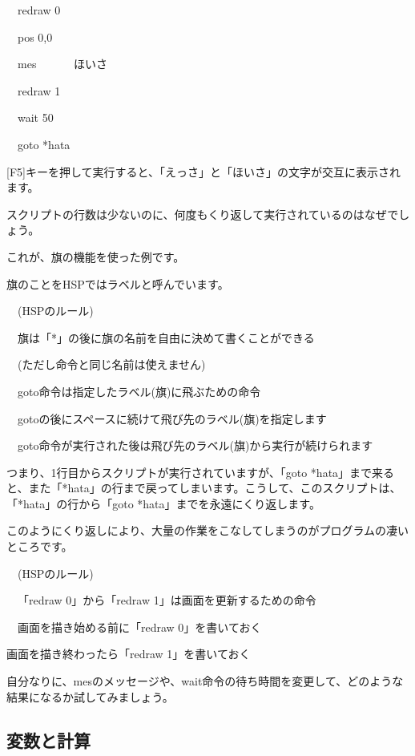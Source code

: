 \documentclass[a4paper,12pt]{jarticle}
\begin{document}
\ \ redraw 0

\ \ pos 0,0

\ \ mes {\textquotedbl}　　　ほいさ{\textquotedbl}

\ \ redraw 1

\ \ wait 50

\ \ goto *hata


\bigskip

[F5]キーを押して実行すると、「えっさ」と「ほいさ」の文字が交互に表示されます。

スクリプトの行数は少ないのに、何度もくり返して実行されているのはなぜでしょう。

これが、旗の機能を使った例です。

旗のことをHSPではラベルと呼んでいます。


\bigskip

\ \ (HSPのルール)


\bigskip

\ \ 旗は「*」の後に旗の名前を自由に決めて書くことができる

\ \ (ただし命令と同じ名前は使えません)

\ \ goto命令は指定したラベル(旗)に飛ぶための命令

\ \ gotoの後にスペースに続けて飛び先のラベル(旗)を指定します

\ \ goto命令が実行された後は飛び先のラベル(旗)から実行が続けられます


\bigskip

つまり、1行目からスクリプトが実行されていますが、「goto
*hata」まで来ると、また「*hata」の行まで戻ってしまいます。こうして、このスクリプトは、「*hata」の行から「goto
*hata」までを永遠にくり返します。

このようにくり返しにより、大量の作業をこなしてしまうのがプログラムの凄いところです。

\bigskip

\ \ (HSPのルール)

\bigskip

\ \ 「redraw 0」から「redraw
1」は画面を更新するための命令

\ \ 画面を描き始める前に「redraw
0」を書いておく

画面を描き終わったら「redraw
1」を書いておく


\bigskip

自分なりに、mesのメッセージや、wait命令の待ち時間を変更して、どのような結果になるか試してみましょう。

\bigskip
\bigskip


\subsection{変数と計算}
\bigskip
\bigskip
\end{document}
